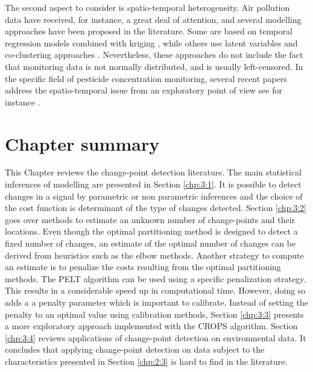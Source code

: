 The second aspect to consider is spatio-temporal heterogeneity. Air pollution data have received, for instance, a great deal of attention, and several modelling approaches have been proposed in the literature. Some are based on temporal regression models combined with kriging \citep{sampson2011,lindstrom2014flexible}, while others use latent variables and co-clustering approaches \citep{bouveyron2021co}. Nevertheless, these approaches do not include the fact that monitoring data is not normally distributed, and is usually left-censored. In the specific field of pesticide concentration monitoring, several recent papers address the spatio-temporal issue from an exploratory point of view see for instance \cite{masia2016,figueiredo2021spatio,aznar2017spatio}. 


\clearpage

\section{Chapter summary}

This Chapter reviews the change-point detection literature. The main statistical inferences of modelling are presented in Section \ref{chp:3:1}. It is possible to detect changes in a signal by parametric or non parametric inferences and the choice of the cost function is determinant of the type of changes detected. Section \ref{chp:3:2} goes over methods to estimate an unknown number of change-points and their locations. Even though the optimal partitioning method is designed to detect a fixed number of changes, an estimate of the optimal number of changes can be derived from heuristics such as the elbow methods. Another strategy to compute an estimate is to penalize the costs resulting from the optimal partitioning methods. The PELT algorithm can be used using a specific penalization strategy. This results in a considerable speed up in computational time. However, doing so adds a a penalty parameter which is important to calibrate. Instead of setting the penalty to an optimal value using calibration methods, Section \ref{chp:3:3} presents a more exploratory approach implemented with the CROPS algorithm. Section \ref{chp:3:4} reviews applications of change-point detection on environmental data. It concludes that applying change-point detection on data subject to the characteristics presented in Section \ref{chp:2:3} is hard to find in the literature.  
 

